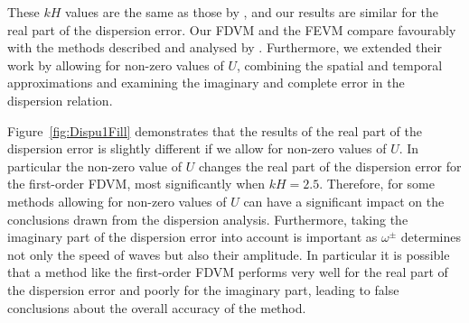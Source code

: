 These $kH$ values are the same as those by \citet{Filippini-etal-2016-381}, and our results are similar for the real part of the dispersion error. Our FDVM and the FEVM compare favourably with the methods described and analysed by \citet{Filippini-etal-2016-381}. Furthermore, we extended their work by allowing for non-zero values of $U$, combining the spatial and temporal approximations and examining the imaginary and complete error in the dispersion relation. 

Figure~\ref{fig:Dispu1Fill} demonstrates that the results of the real part of the dispersion error  is slightly different if we allow for non-zero values of $U$. In particular the non-zero value of $U$ changes the real part of the dispersion error for the first-order FDVM, most significantly when $kH = 2.5$. Therefore, for some methods allowing for non-zero values of $U$ can have a significant impact on the conclusions drawn from the dispersion analysis. Furthermore, taking the imaginary part of the dispersion error into account is important as $\omega^\pm$ determines not only the speed of waves but also their amplitude. In particular it is possible that a method like the first-order FDVM performs very well for the real part of the dispersion error and poorly for the imaginary part, leading to false conclusions about the overall accuracy of the method.


